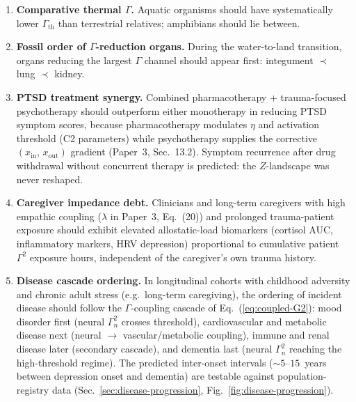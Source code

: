 \documentclass[aps,pre,twocolumn,superscriptaddress,floatfix]{revtex4-2}
\begin{document}
\begin{enumerate}
  \item \textbf{Comparative thermal $\Gamma$.}
    Aquatic organisms should have systematically lower
    $\Gamma_{\text{th}}$ than terrestrial relatives;
    amphibians should lie between.

  \item \textbf{Fossil order of $\Gamma$-reduction organs.}
    During the water-to-land transition, organs reducing
    the largest $\Gamma$ channel should appear first:
    integument $\prec$ lung $\prec$ kidney.

  \item \textbf{PTSD treatment synergy.}
    Combined pharmacotherapy + trauma-focused psychotherapy
    should outperform either monotherapy in reducing
    PTSD symptom scores, because pharmacotherapy modulates
    $\eta$ and activation threshold (C2 parameters) while
    psychotherapy supplies the corrective
    $(x_{\text{in}},\,x_{\text{out}})$ gradient
    (Paper~3, Sec.~13.2).
    Symptom recurrence after drug withdrawal without
    concurrent therapy is predicted: the $Z$-landscape
    was never reshaped.

  \item \textbf{Caregiver impedance debt.}
    Clinicians and long-term caregivers with high empathic
    coupling ($\lambda$ in Paper~3, Eq.~(20))
    and prolonged trauma-patient exposure should exhibit
    elevated allostatic-load biomarkers (cortisol AUC,
    inflammatory markers, HRV depression) proportional
    to cumulative patient $\Gamma^2$ exposure hours,
    independent of the caregiver's own trauma history.

  \item \textbf{Disease cascade ordering.}
    In longitudinal cohorts with childhood adversity
    and chronic adult stress (e.g.\ long-term caregiving),
    the ordering of incident disease should follow the
    $\Gamma$-coupling cascade of
    Eq.~(\ref{eq:coupled-G2}):
    mood disorder first (neural $\Gamma_n^2$ crosses
    threshold), cardiovascular and metabolic disease
    next (neural $\to$ vascular/metabolic coupling),
    immune and renal disease later (secondary cascade),
    and dementia last (neural $\Gamma_n^2$ reaching
    the high-threshold regime).
    The predicted inter-onset intervals
    (${\sim}5$--$15$~years between depression onset
    and dementia) are testable against
    population-registry data
    (Sec.~\ref{sec:disease-progression},
    Fig.~\ref{fig:disease-progression}).


\end{enumerate}
\end{document}
